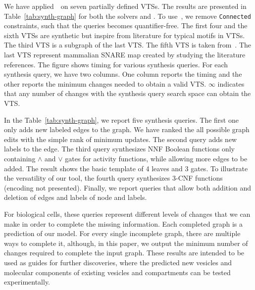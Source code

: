

We have applied~\ourtool~on seven partially defined VTSs.
%
The results are presented in Table~\ref{tab:synth-graph} for both the solvers
\depqbf and \zthree.
%
To use~\zthree, we remove \texttt{Connected} constraints, such that the queries becomes
quantifier-free.
%
The first four and the sixth VTSs are synthetic but inspire from literature for
typical motifs in VTSs. 
%
The third VTS is a subgraph of the last VTS.
%
%
The fifth VTS is taken from~\cite{burri2004complete}.
%
The last VTS represent mammalian SNARE map created by studying the literature references.  
%
The figure shows timing for various synthesis queries.
%
For each synthesis query, we have two columns.
%
One column reports the timing and the other reports the minimum changes needed to obtain a valid VTS.
%
$\infty$ indicates that any number of changes with the synthesis query
search space can obtain the VTS.

In the Table~\ref{tab:synth-graph}, we report five synthesis queries.
%
The first one only adds new labeled edges to the graph.
%
We have ranked the all possible graph edits with the simple rank of
minimum updates.
%
The second query adds new labels to the edge.
%
The third query synthesizes NNF Boolean functions only containing
$\land$ and $\lor$ gates for activity functions, while allowing
more edges to be added.
%
The result shows the basic template of 4 leaves and 3 gates.
%
To illustrate the versatility of our tool, the fourth query
synthesizes $3$-CNF functions (encoding not presented).
%
Finally, we report queries that allow both addition and deletion of edges and labels of node and labels. 

For biological cells, these queries represent different levels of changes that we can make in order to complete the missing information.
%
Each completed graph is a prediction of our model. 
%
For every single incomplete graph, there are multiple ways to complete it, although, in this paper, we output the minimum number of changes required to complete the input graph. 
%
These results are intended to be used as guides for further discoveries, where the predicted new vesicles and molecular components of existing vesicles and compartments can be tested experimentally.
%
%
